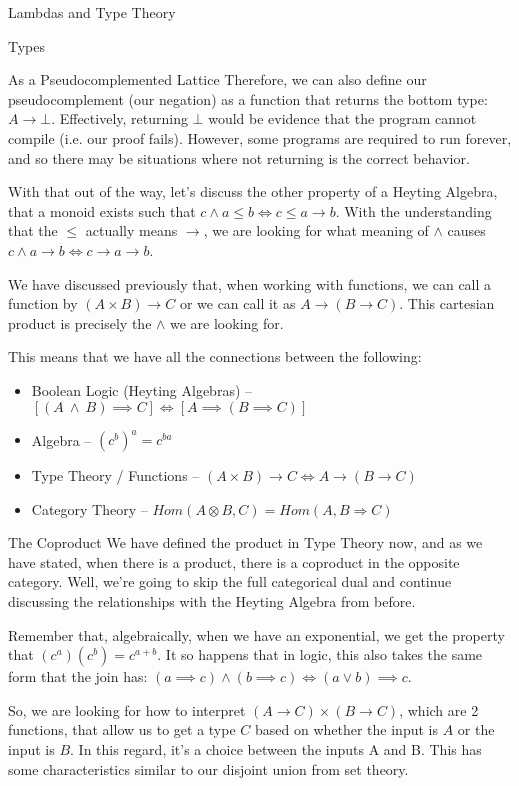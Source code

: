 \begin{part}{Lambdas and Type Theory}
\begin{chapter}{Types}
\begin{section}{As a Pseudocomplemented Lattice}
            Therefore, we can also define our pseudocomplement (our negation) as a function that returns the bottom type: $A \to \bot$. Effectively, returning $\bot$ would be evidence that the program cannot compile (i.e. our proof fails). However, some programs are required to run forever, and so there may be situations where not returning is the correct behavior.
        
            With that out of the way, let's discuss the other property of a Heyting Algebra, that a monoid exists such that $c\wedge a \leq b \iff c \leq a \to b$. With the understanding that the $\leq$ actually means $\to$, we are looking for what meaning of $\wedge$ causes $c\wedge a \to b \iff c \to a \to b$.
        
            We have discussed previously that, when working with functions, we can call a function by $(A \times B) \to C$ or we can call it as $A \to (B \to C)$. This cartesian product is precisely the $\wedge$ we are looking for.
        
            This means that we have all the connections between the following:
            \begin{itemize}
                \item Boolean Logic (Heyting Algebras) -- $[(A\ \wedge\ B) \implies C] \iff [A \implies (B \implies C)]$
                \item Algebra -- $(c^{b})^{a} = c^{ba}$
                \item Type Theory / Functions -- $(A\times B) \to C \iff A \to (B \to C)$
                \item Category Theory -- $Hom(A \otimes B, C) = Hom(A, B \Rightarrow C)$
            \end{itemize}
        \end{section}
        \begin{section}{The Coproduct}
            We have defined the product in Type Theory now, and as we have stated, when there is a product, there is a coproduct in the opposite category. Well, we're going to skip the full categorical dual and continue discussing the relationships with the Heyting Algebra from before.
            
            Remember that, algebraically, when we have an exponential, we get the property that $(c^a)(c^b) = c^{a + b}$. It so happens that in logic, this also takes the same form that the join has: $(a \implies c) \wedge (b\implies c) \iff (a \vee b) \implies c$.
            
            So, we are looking for how to interpret $(A \to C) \times (B \to C)$, which are 2 functions, that allow us to get a type $C$ based on whether the input is $A$ or the input is $B$. In this regard, it's a choice between the inputs A and B. This has some characteristics similar to our disjoint union from set theory.
            

\end{section}
\end{chapter}
\end{part}
